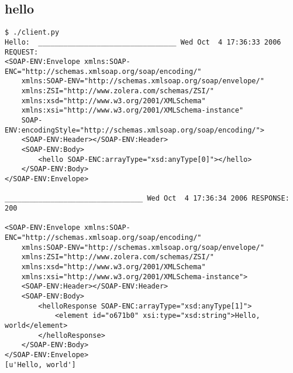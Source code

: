 \subsection{hello}
\begin{verbatim}
$ ./client.py 
Hello:  _________________________________ Wed Oct  4 17:36:33 2006 REQUEST:
<SOAP-ENV:Envelope xmlns:SOAP-ENC="http://schemas.xmlsoap.org/soap/encoding/" 
	xmlns:SOAP-ENV="http://schemas.xmlsoap.org/soap/envelope/" 
	xmlns:ZSI="http://www.zolera.com/schemas/ZSI/" 
	xmlns:xsd="http://www.w3.org/2001/XMLSchema" 
	xmlns:xsi="http://www.w3.org/2001/XMLSchema-instance" 
	SOAP-ENV:encodingStyle="http://schemas.xmlsoap.org/soap/encoding/">
	<SOAP-ENV:Header></SOAP-ENV:Header>
	<SOAP-ENV:Body>
		<hello SOAP-ENC:arrayType="xsd:anyType[0]"></hello>
	</SOAP-ENV:Body>
</SOAP-ENV:Envelope>

_________________________________ Wed Oct  4 17:36:34 2006 RESPONSE:
200

<SOAP-ENV:Envelope xmlns:SOAP-ENC="http://schemas.xmlsoap.org/soap/encoding/" 
	xmlns:SOAP-ENV="http://schemas.xmlsoap.org/soap/envelope/" 
	xmlns:ZSI="http://www.zolera.com/schemas/ZSI/" 
	xmlns:xsd="http://www.w3.org/2001/XMLSchema" 
	xmlns:xsi="http://www.w3.org/2001/XMLSchema-instance">
	<SOAP-ENV:Header></SOAP-ENV:Header>
	<SOAP-ENV:Body>
		<helloResponse SOAP-ENC:arrayType="xsd:anyType[1]">
			<element id="o671b0" xsi:type="xsd:string">Hello, world</element>
		</helloResponse>
	</SOAP-ENV:Body>
</SOAP-ENV:Envelope>
[u'Hello, world']
\end{verbatim}

